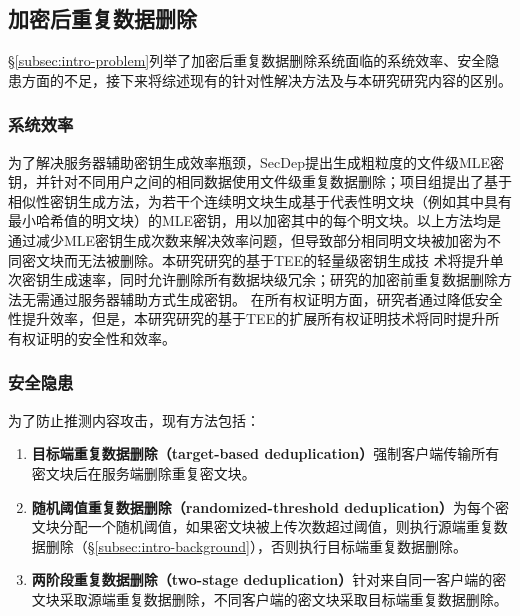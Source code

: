 \subsection{加密后重复数据删除}
\label{subsec:compare-deduplication}

\S\ref{subsec:intro-problem}列举了加密后重复数据删除系统面临的系统效率、安全隐患方面的不足，接下来将综述现有的针对性解决方法及与本研究研究内容的区别。

\subsubsection{系统效率}
\label{subsubsec:compare-deduplication-performance}

为了解决服务器辅助密钥生成效率瓶颈，SecDep\cite{zhou2015secdep}提出生成粗粒度的文件级MLE密钥，并针对不同用户之间的相同数据使用文件级重复数据删除；项目组提出了基于相似性密钥生成方法\cite{qin17}，为若干个连续明文块生成基于代表性明文块（例如其中具有最小哈希值的明文块）的MLE密钥，用以加密其中的每个明文块。以上方法均是通过减少MLE密钥生成次数来解决效率问题，但导致部分相同明文块被加密为不同密文块而无法被删除。本研究研究的基于TEE的轻量级密钥生成技
术将提升单次密钥生成速率，同时允许删除所有数据块级冗余；研究的加密前重复数据删除方法无需通过服务器辅助方式生成密钥。
在所有权证明方面，研究者通过降低安全性提升效率\cite{xu2013weak,pietro12}，但是，本研究研究的基于TEE的扩展所有权证明技术将同时提升所有权证明的安全性和效率。

\subsubsection{安全隐患}
\label{subsubsec:compare-deduplication-security}

为了防止推测内容攻击，现有方法包括：

\begin{enumerate}
    \item \textbf{目标端重复数据删除（target-based deduplication）}\cite{harnik10}强制客户端传输所有密文块后在服务端删除重复密文块。
    \item \textbf{随机阈值重复数据删除（randomized-threshold deduplication）}\cite{harnik10}为每个密文块分配一个随机阈值，如果密文块被上传次数超过阈值，则执行源端重复数据删除（\S\ref{subsec:intro-background}），否则执行目标端重复数据删除。
    \item \textbf{两阶段重复数据删除（two-stage deduplication）}\cite{li2015cdstore}针对来自同一客户端的密文块采取源端重复数据删除，不同客户端的密文块采取目标端重复数据删除。
\end{enumerate}

